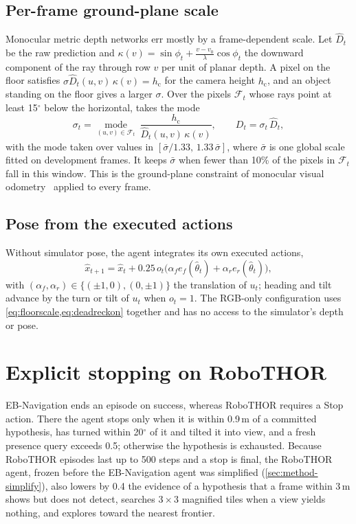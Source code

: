 \subsection{Per-frame ground-plane scale}
Monocular metric depth networks err mostly by a frame-dependent scale. Let $\hat D_t$ be the raw prediction and
$\kappa(v)=\sin\phi_t+\frac{v-v_0}{\lambda}\cos\phi_t$ the downward component of the ray through row $v$ per unit of
planar depth. A pixel on the floor satisfies $\sigma\hat D_t(u,v)\,\kappa(v)=h_\mathrm{c}$ for the camera height $h_\mathrm{c}$, and an
object standing on the floor gives a larger $\sigma$. Over the pixels $\mathcal{F}_t$ whose rays point at least
15$^\circ$ below the horizontal, \ours takes the mode
\begin{equation}
\sigma_t=\operatorname*{mode}_{(u,v)\in\mathcal{F}_t}\ \frac{h_\mathrm{c}}{\hat D_t(u,v)\,\kappa(v)},\qquad D_t=\sigma_t\,\hat D_t ,
\label{eq:floorscale}
\end{equation}
with the mode taken over values in $[\bar\sigma/1.33,\,1.33\,\bar\sigma]$, where $\bar\sigma$ is one global scale
fitted on development frames. It keeps $\bar\sigma$ when fewer than 10\% of the pixels in $\mathcal{F}_t$ fall in this
window. This is the ground-plane constraint of monocular visual odometry~\cite{song2014robust} applied to every frame.

\subsection{Pose from the executed actions}
Without simulator pose, the agent integrates its own executed actions,
\begin{equation}
\hat x_{t+1}=\hat x_t+0.25\,o_t\big(\alpha_f e_f(\hat\theta_t)+\alpha_r e_r(\hat\theta_t)\big),
\label{eq:deadreckon}
\end{equation}
with $(\alpha_f,\alpha_r)\in\{(\pm1,0),(0,\pm1)\}$ the translation of $u_t$; heading and tilt advance by the turn or
tilt of $u_t$ when $o_t=1$. The RGB-only configuration uses \cref{eq:floorscale,eq:deadreckon} together and has no
access to the simulator's depth or pose.

\section{Explicit stopping on RoboTHOR}
\label{sec:method-stop}
EB-Navigation ends an episode on success, whereas RoboTHOR requires a Stop action. There the agent stops only when it
is within 0.9\,m of a committed hypothesis, has turned within 20$^\circ$ of it and tilted it into view, and a fresh
presence query exceeds 0.5; otherwise the hypothesis is exhausted. Because RoboTHOR episodes last up to 500 steps
and a stop is final, the RoboTHOR agent, frozen before the EB-Navigation agent was simplified
(\cref{sec:method-simplify}), also lowers by 0.4 the evidence of a hypothesis that a frame within 3\,m shows but
does not detect, searches $3{\times}3$ magnified tiles when a view yields nothing, and explores toward the nearest
frontier.

